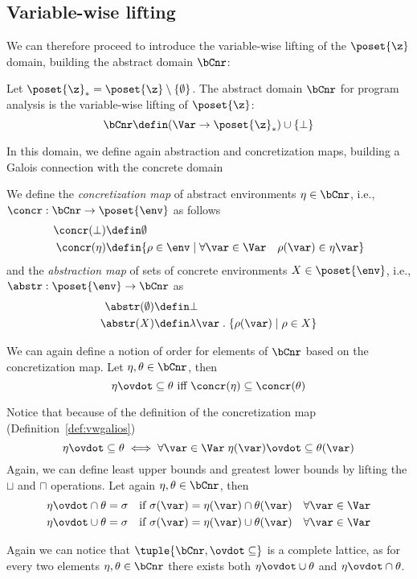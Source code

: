 \subsection{Variable-wise lifting}\label{sub:vwintervals}

We can therefore proceed to introduce the variable-wise lifting of the
\(\poset{\z}\) domain, building the abstract domain \(\bCnr\):

\begin{definition}
  Let \(\poset{\z}_* = \poset{\z} \setminus \{\emptyset\}\). The
  abstract domain \(\bCnr\) for program analysis is the variable-wise
  lifting of \(\poset{\z}\):
  \[ \bCnr \defin (\Var \to \poset{\z}_*) \cup \{ \bot \} \]
\end{definition}

In this domain, we define again abstraction and concretization maps,
building a Galois connection with the concrete domain

\begin{definition}\label{def:vwgalios}
  We define the \emph{concretization map} of abstract environments
  \(\eta \in \bCnr\), i.e., \({\concr : \bCnr \to \poset{\env}}\) as
  follows
  \begin{align*}
    \concr(\bot) & \defin \emptyset \\
    \concr(\eta) & \defin \{\rho \in \env \mid \forall \var \in \Var \quad \rho(\var) \in \eta\var\}
  \end{align*}
  and the \emph{abstraction map} of sets of concrete environments
  \(X \in \poset{\env}\), i.e., \(\abstr : \poset{\env} \to \bCnr\) as
  \begin{align*}
    \abstr(\emptyset) & \defin \bot \\
    \abstr(X) & \defin \lambda \var \; . \; \{\rho(\var) \mid \rho \in X\}
  \end{align*}
\end{definition}

We can again define a notion of order for elements of \(\bCnr\) based
on the concretization map. Let \(\eta, \theta \in \bCnr\), then
\begin{equation*}
  \eta \ovdot\subseteq \theta \text{ iff } \concr(\eta) \subseteq \concr(\theta)
\end{equation*}

Notice that because of the definition of the concretization map
(Definition~\ref{def:vwgalios})
\begin{equation*}
  \eta \ovdot\subseteq \theta \iff \forall \var \in \Var \; \eta(\var) \ovdot\subseteq \theta(\var)
\end{equation*}
Again, we can define least upper bounds and greatest lower bounds by
lifting the \(\sqcup\) and \(\sqcap\) operations. Let again
\(\eta, \theta \in \bCnr\), then
\begin{align*}
  \eta \ovdot\cap \theta = \sigma & \quad \text{if } \sigma(\var) = \eta(\var) \cap \theta(\var) \quad \forall \var\in\Var \\
  \eta \ovdot\cup \theta = \sigma & \quad \text{if } \sigma(\var) = \eta(\var) \cup \theta(\var) \quad \forall \var\in\Var
\end{align*}

Again we can notice that \(\tuple{\bCnr, \ovdot\subseteq}\) is a
complete lattice, as for every two elements \(\eta,\theta\in\bCnr\)
there exists both \(\eta \ovdot\cup \theta\) and
\(\eta \ovdot\cap \theta\).
